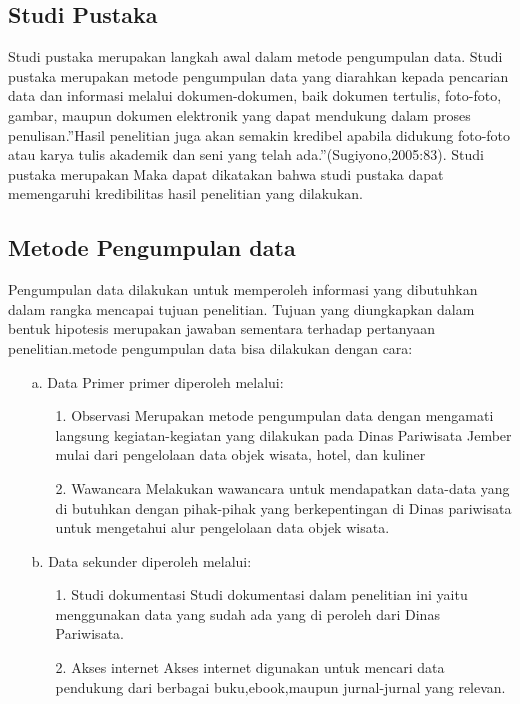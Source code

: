 \documentclass{jtetiproposalskripsi}
\begin{document}
\subsection{Studi Pustaka} 
Studi pustaka merupakan langkah awal dalam metode pengumpulan data. Studi pustaka merupakan metode pengumpulan data yang diarahkan kepada pencarian data dan informasi melalui dokumen-dokumen, baik dokumen tertulis, foto-foto, gambar, maupun dokumen elektronik yang dapat mendukung dalam proses penulisan.”Hasil penelitian juga akan semakin kredibel apabila didukung foto-foto atau karya tulis akademik dan seni yang telah ada.”(Sugiyono,2005:83). Studi pustaka merupakan Maka dapat dikatakan bahwa studi pustaka dapat memengaruhi kredibilitas hasil penelitian yang dilakukan. 
\subsection{Metode Pengumpulan data}  
Pengumpulan data dilakukan untuk memperoleh informasi yang dibutuhkan dalam rangka mencapai tujuan penelitian. Tujuan yang diungkapkan dalam bentuk hipotesis merupakan jawaban sementara terhadap pertanyaan penelitian.metode pengumpulan data bisa dilakukan dengan cara:
\begin{itemize}
\item[a.] Data Primer primer diperoleh melalui:
\begin{itemize}
\item[1.] Observasi
Merupakan metode pengumpulan data dengan mengamati langsung kegiatan-kegiatan  yang dilakukan pada Dinas Pariwisata Jember mulai  dari  pengelolaan data objek wisata, hotel, dan kuliner
\item[2.]Wawancara 
 Melakukan wawancara untuk mendapatkan data-data yang di butuhkan dengan pihak-pihak yang berkepentingan di Dinas pariwisata untuk mengetahui alur pengelolaan data objek wisata.
\end{itemize}
\item[b.]Data sekunder diperoleh melalui:
\begin{itemize}
\item[1.]Studi dokumentasi
Studi dokumentasi dalam penelitian ini yaitu menggunakan data yang sudah ada yang di peroleh dari Dinas Pariwisata.
\item[2.]Akses internet
Akses internet digunakan untuk mencari data pendukung dari berbagai buku,ebook,maupun jurnal-jurnal yang relevan.
\end{itemize}
\end{itemize}
\end{document}

